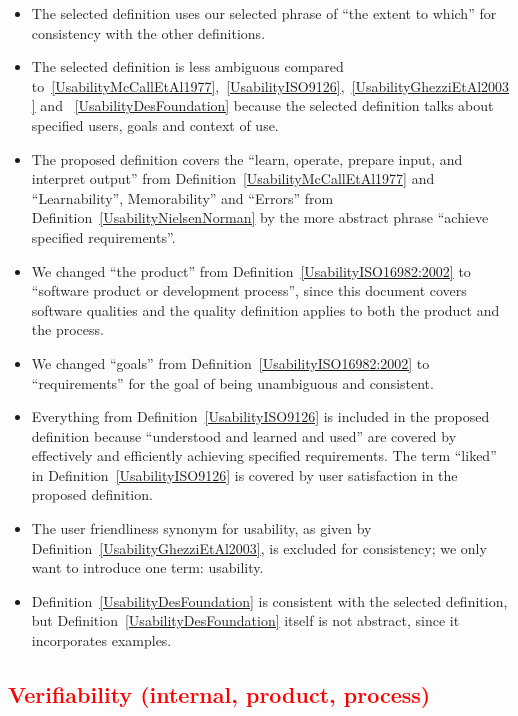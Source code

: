 \documentclass[letterpaper, cleveref]{lipics-v2019}
\newcommand{\authornote}[3]{\textcolor{#1}{[#3 ---#2]}}
\newcommand{\authornote}[3]{}
\newcommand{\oo}[1]{\authornote{magenta}{OO}{#1}} %
\newcommand{\notdone}[1]{\textcolor{red}{#1}}
\theoremstyle{definition}
\begin{document}
\begin{itemize}
  \item The selected definition uses our selected phrase of ``the extent to
  which'' for consistency with the other definitions.
  \item The selected definition is less ambiguous compared
  to~\ref{UsabilityMcCallEtAl1977},~\ref{UsabilityISO9126},~\ref{UsabilityGhezziEtAl2003}
  and ~\ref{UsabilityDesFoundation} because the selected definition talks about
  specified users, goals and context of use.
  \item The proposed definition covers the ``learn, operate, prepare input, and
  interpret output'' from Definition~\ref{UsabilityMcCallEtAl1977} and
  ``Learnability'', Memorability'' and ``Errors'' from
  Definition~\ref{UsabilityNielsenNorman} by the more abstract phrase ``achieve
  specified requirements''.
  \item We changed ``the product'' from Definition~\ref{UsabilityISO16982:2002}
  to ``software product or development process'', since this document covers
  software qualities and the quality definition applies to both the product and
  the process.
  \item We changed ``goals'' from Definition~\ref{UsabilityISO16982:2002} to
  ``requirements'' for the goal of being unambiguous and consistent.
  \item Everything from Definition~\ref{UsabilityISO9126} is included in the
  proposed definition because ``understood and learned and used'' are covered by
  effectively and efficiently achieving specified requirements.  The term
  ``liked'' in Definition~\ref{UsabilityISO9126} is covered by user satisfaction
  in the proposed definition.
  \item The user friendliness synonym for usability, as given by
  Definition~\ref{UsabilityGhezziEtAl2003}, is excluded for consistency; we only
  want to introduce one term: usability.
  \item Definition~\ref{UsabilityDesFoundation} is consistent with the selected
  definition, but Definition~\ref{UsabilityDesFoundation} itself is not
  abstract, since it incorporates examples.
\end{itemize}


\subsection{\notdone{Verifiability (internal, product, process)}} %
\end{document}
